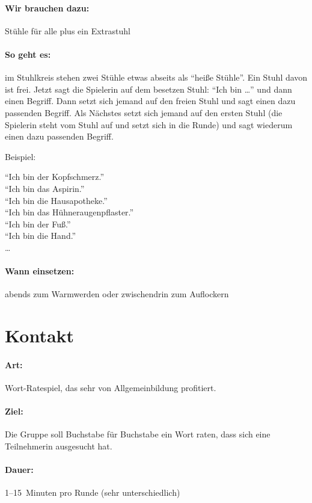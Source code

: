 \paragraph{Wir brauchen dazu:} Stühle für alle plus ein Extrastuhl
\paragraph{So geht es:} im Stuhlkreis stehen zwei Stühle etwas abseits als "`heiße Stühle"'. Ein Stuhl davon ist frei. Jetzt sagt die Spielerin auf dem besetzen Stuhl: "`Ich bin \ldots"' und dann einen Begriff. Dann setzt sich jemand auf den freien Stuhl und sagt einen dazu passenden Begriff. Als Nächstes setzt sich jemand auf den ersten Stuhl (die Spielerin steht vom Stuhl auf und setzt sich in die Runde) und sagt wiederum einen dazu passenden Begriff.

Beispiel:

"`Ich bin der Kopfschmerz."'\\
"`Ich bin das Aspirin."'\\
"`Ich bin die Hausapotheke."'\\
"`Ich bin das Hühneraugenpflaster."'\\
"`Ich bin der Fuß."'\\
"`Ich bin die Hand."'\\
\ldots
\paragraph{Wann einsetzen:} abends zum Warmwerden oder zwischendrin zum Auflockern



\section{Kontakt}
\paragraph{Art:} Wort-Ratespiel, das sehr von Allgemeinbildung profitiert.
\paragraph{Ziel:} Die Gruppe soll Buchstabe für Buchstabe ein Wort raten, dass sich eine Teilnehmerin ausgesucht hat.
\paragraph{Dauer:} 1--15~Minuten pro Runde (sehr unterschiedlich)
